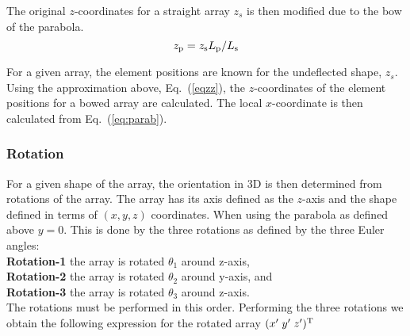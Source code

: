 \documentclass{saclantc}
\begin{document}
The original $z$-coordinates for a straight array $z_s$ is then modified
due to the bow of the parabola.
\begin{equation}
z_{\rm p}=z_{\rm s} L_{\rm p}/L_{\rm s}
\label{eqzz}
\end{equation}

For a given array, the element positions are known for the undeflected
shape, $z_s$. 
Using the approximation above, Eq.~(\ref{eqzz}), the $z$-coordinates of
the element positions for a bowed array are calculated. 
The local $x$-coordinate is then calculated from Eq.~(\ref{eq:parab}).


\subsubsection{Rotation}

For a given shape of the array, the orientation in 3D is then determined from  rotations of the
array. The array has its  axis defined as the
$z$-axis and the shape defined in terms of $(x,y,z)$ coordinates.
When using the parabola as defined above $ y=0$. 
 This is done by the three rotations as defined by the three Euler angles\cite{marrion}:\\ 
{\bf Rotation-1} the array is rotated $\theta_1$ around z-axis,\\ 
{\bf Rotation-2} the array is rotated $\theta_2$ around y-axis, and \\
{\bf Rotation-3} the array is rotated $\theta_3$ around z-axis. \\
%
The rotations must be performed in this order. Performing the three
rotations we obtain the following expression for the rotated array 
$ (x'\; y'\; z')^{\rm T}$
\end{document}
